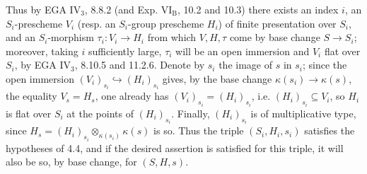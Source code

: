 Thus by EGA IV$_3$, 8.8.2 (and Exp. VI$_{\mathrm B}$, 10.2 and 10.3) there exists an index $i$, an $S_i$-prescheme $V_i$ (resp. an $S_i$-group prescheme $H_i$) of finite presentation over $S_i$, and an $S_i$-morphism $\tau_i:V_i\to H_i$ from which $V,H,\tau$ come by base change $S\to S_i$; moreover, taking $i$ sufficiently large, $\tau_i$ will be an open immersion and $V_i$ flat over $S_i$, by EGA IV$_3$, 8.10.5 and 11.2.6. Denote by $s_i$ the image of $s$ in $s_i$; since the open immersion $(V_i)_{s_i}\hookrightarrow(H_i)_{s_i}$ gives, by the base change $\kappa(s_i)\to\kappa(s)$, the equality $V_s=H_s$, one already has $(V_i)_{s_i}=(H_i)_{s_i}$, i.e. $(H_i)_{s_i}\subseteq V_i$, so $H_i$ is flat over $S_i$ at the points of $(H_i)_{s_i}$. Finally, $(H_i)_{s_i}$ is of multiplicative type, since $H_s=(H_i)_{s_i}\otimes_{\kappa(s_i)}\kappa(s)$ is so. Thus the triple $(S_i,H_i,s_i)$ satisfies the hypotheses of 4.4, and if the desired assertion is satisfied for this triple, it will also be so, by base change, for $(S,H,s)$.
